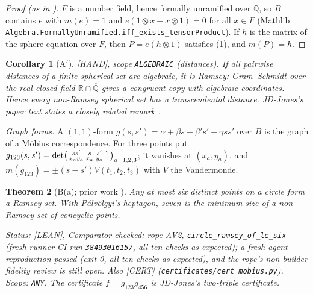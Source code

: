 \documentclass[11pt]{amsart}
\newcommand{\st}[1]{\textsf{[#1]}}
\newcommand{\Q}{\mathbb{Q}}
\newcommand{\R}{\mathbb{R}}
\newcommand{\Qbar}{\overline{\mathbb{Q}}}
\theoremstyle{plain}
\newtheorem{theorem}{Theorem}[section]
\newtheorem{corollary}[theorem]{Corollary}
\theoremstyle{definition}
\begin{document}
\begin{proof}[Proof (as in \cite{JDJones,Rogerhu})]
$F$ is a number field, hence formally unramified over $\Q$, so $B$ contains $e$ with $m(e)=1$ and
$e(1\otimes x-x\otimes1)=0$ for all $x\in F$ (Mathlib
\texttt{Algebra.}\allowbreak\texttt{FormallyUnramified.}\allowbreak\texttt{iff\_\allowbreak{}exists\_\allowbreak{}tensorProduct}). If $h$ is the matrix of the sphere
equation over $F$, then $P=e(h\otimes1)$ satisfies (1), and $m(P)=h$.
\end{proof}

\begin{corollary}[A$'$]\label{cor:Aprime}
\st{HAND}, scope \texttt{ALGEBRAIC} (distances). If all pairwise distances of a finite spherical set
are algebraic, it is Ramsey: Gram--Schmidt over the real closed field $\R\cap\Qbar$ gives a
congruent copy with algebraic coordinates. Hence every non-Ramsey spherical set has a transcendental
distance. JD-Jones's paper text states a closely related remark \cite{JDJones}.
\end{corollary}

\noindent\emph{Graph forms.} A $(1,1)$-form $g(s,s')=\alpha+\beta s+\beta's'+\gamma ss'$ over $B$ is
the graph of a M\"obius correspondence. For three points put
$g_{123}(s,s')=\det\begin{psmallmatrix}ss'&s&s'&1\\ x_ay_a&x_a&y_a&1\end{psmallmatrix}_{a=1,2,3}$;
it vanishes at $(x_a,y_a)$, and $m(g_{123})=\pm(s-s')V(t_1,t_2,t_3)$ with $V$ the Vandermonde.

\begin{theorem}[B(a); prior work \cite{JDJones}]\label{thm:Ba}
Any at most six distinct points on a circle form a Ramsey set. With P\'alv\"olgyi's heptagon,
seven is the minimum size of a non-Ramsey set of concyclic points.

\smallskip\noindent\emph{Status:} \st{LEAN}, Comparator-checked: rope AV2,
\texttt{circle\_ramsey\_of\_le\_six} (fresh-runner CI run \texttt{38493016157}, all ten checks as
expected); a fresh-agent reproduction passed (exit 0, all ten checks as expected), and the rope's
non-builder fidelity review is still open. Also \st{CERT}
(\texttt{certificates/cert\_mobius.py}). Scope: \texttt{ANY}. The certificate $f=g_{123}g_{456}$ is
JD-Jones's two-triple certificate.
\end{theorem}
\end{document}
